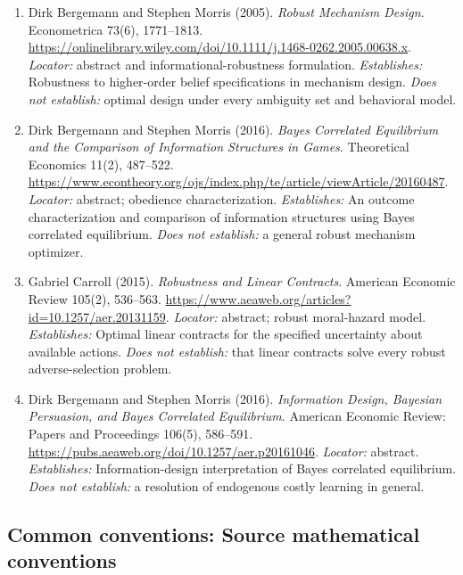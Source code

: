 \documentclass[11pt,a4paper]{article}
\begin{document}
\begin{enumerate}

\item[S1] Dirk Bergemann and Stephen Morris (2005). \emph{Robust Mechanism Design}. Econometrica 73(6), 1771--1813. \url{https://onlinelibrary.wiley.com/doi/10.1111/j.1468-0262.2005.00638.x}. \textit{Locator:} abstract and informational-robustness formulation. \textit{Establishes:} Robustness to higher-order belief specifications in mechanism design. \textit{Does not establish:} optimal design under every ambiguity set and behavioral model.

\item[S2] Dirk Bergemann and Stephen Morris (2016). \emph{Bayes Correlated Equilibrium and the Comparison of Information Structures in Games}. Theoretical Economics 11(2), 487--522. \url{https://www.econtheory.org/ojs/index.php/te/article/viewArticle/20160487}. \textit{Locator:} abstract; obedience characterization. \textit{Establishes:} An outcome characterization and comparison of information structures using Bayes correlated equilibrium. \textit{Does not establish:} a general robust mechanism optimizer.

\item[S3] Gabriel Carroll (2015). \emph{Robustness and Linear Contracts}. American Economic Review 105(2), 536--563. \url{https://www.aeaweb.org/articles?id=10.1257/aer.20131159}. \textit{Locator:} abstract; robust moral-hazard model. \textit{Establishes:} Optimal linear contracts for the specified uncertainty about available actions. \textit{Does not establish:} that linear contracts solve every robust adverse-selection problem.

\item[S4] Dirk Bergemann and Stephen Morris (2016). \emph{Information Design, Bayesian Persuasion, and Bayes Correlated Equilibrium}. American Economic Review: Papers and Proceedings 106(5), 586--591. \url{https://pubs.aeaweb.org/doi/10.1257/aer.p20161046}. \textit{Locator:} abstract. \textit{Establishes:} Information-design interpretation of Bayes correlated equilibrium. \textit{Does not establish:} a resolution of endogenous costly learning in general.

\end{enumerate}

\subsection*{Common conventions: Source mathematical conventions}
\end{document}
